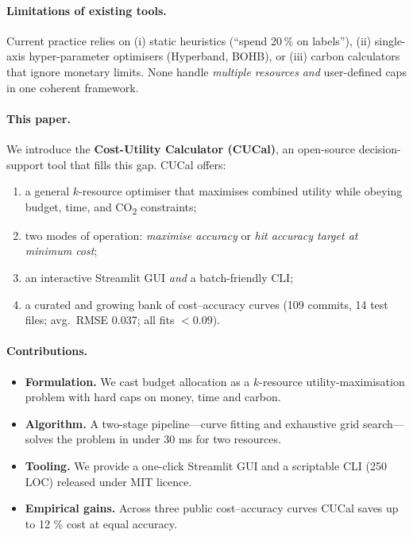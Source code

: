 \documentclass[11pt]{article}
\begin{document}
\paragraph{Limitations of existing tools.}
Current practice relies on
(i) static heuristics (“spend 20\,\% on labels”),
(ii) single-axis hyper-parameter optimisers (Hyperband, BOHB), or
(iii) carbon calculators that ignore monetary limits.
None handle \emph{multiple resources} \emph{and} user-defined caps in
one coherent framework.

\paragraph{This paper.}
We introduce the \textbf{Cost-Utility Calculator (CUCal)}, an
open-source decision-support tool that fills this gap.
CUCal offers:
\begin{enumerate}
  \item a general \(k\)-resource optimiser that maximises combined
        utility while obeying budget, time, and
        \mbox{CO\textsubscript{2}} constraints;
  \item two modes of operation: \emph{maximise accuracy} or
        \emph{hit accuracy target at minimum cost};
  \item an interactive Streamlit GUI \emph{and} a batch-friendly CLI;
  \item a curated and growing bank of cost–accuracy curves
        (109 commits, 14 test files; avg.\ RMSE 0.037; all fits \(< 0.09\)).
\end{enumerate}

\paragraph{Contributions.}
\begin{itemize}
  \item \textbf{Formulation.}  We cast budget allocation as a
        $k$-resource utility-maximisation problem with hard caps on
        money, time and carbon.
  \item \textbf{Algorithm.}  A two-stage pipeline—curve fitting and
        exhaustive grid search—solves the problem in under 30 ms for
        two resources.
  \item \textbf{Tooling.}  We provide a one-click Streamlit GUI and a
        scriptable CLI (250 LOC) released under MIT licence.
  \item \textbf{Empirical gains.}  Across three public
        cost–accuracy curves CUCal saves up to 12 \% cost at equal
        accuracy.
\end{itemize}
\end{document}
